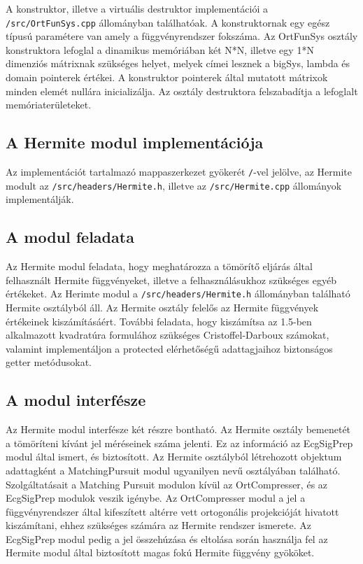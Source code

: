 \documentclass[oneside,titlepage,12pt,a4paper]{report}
\begin{document}
\par A konstruktor, illetve a virtuális destruktor implementációi a \texttt{/src/OrtFunSys.cpp} állományban találhatóak. A konstruktornak egy egész típusú paramétere van amely a függvényrendszer fokszáma. Az OrtFunSys osztály konstruktora lefoglal a dinamikus memóriában két N*N, illetve egy 1*N dimenziós mátrixnak szükséges helyet, melyek címei lesznek a bigSys, lambda és domain pointerek értékei. A konstruktor pointerek által mutatott mátrixok minden elemét nullára inicializálja. Az osztály destruktora felszabadítja a lefoglalt memóriaterületeket. 


\subsection{A Hermite modul implementációja}

Az implementációt tartalmazó mappaszerkezet gyökerét \texttt{/}-vel jelölve, az Hermite modult  az \texttt{/src/headers/Hermite.h}, illetve az \texttt{/src/Hermite.cpp} állományok implementálják.

\subsection*{A modul feladata}

\par Az Hermite modul feladata, hogy meghatározza a tömörítő eljárás által felhasznált Hermite függvényeket, illetve a felhasználásukhoz szükséges egyéb értékeket. Az Herimte modul a \texttt{/src/headers/Hermite.h} állományban található Hermite osztályból áll. Az Hermite osztály felelős az Hermite függvények értékeinek kiszámításáért. További feladata, hogy kiszámítsa az 1.5-ben alkalmazott kvadratúra formulához szükséges Cristoffel-Darboux számokat, valamint implementáljon a protected elérhetőségű adattagjaihoz biztonságos getter metódusokat.

\subsection*{A modul interfésze}

\par Az Hermite modul interfésze két részre bontható. Az Hermite osztály bemenetét a tömöríteni kívánt jel méréseinek száma jelenti. Ez az információ az EcgSigPrep modul által ismert, és biztosított. Az Hermite osztályból létrehozott objektum adattagként a MatchingPursuit modul ugyanilyen nevű osztályában található. Szolgáltatásait a Matching Pursuit modulon kívül az OrtCompresser, és az EcgSigPrep modulok veszik igénybe. Az OrtCompresser modul a jel a függvényrendszer által kifeszített altérre vett ortogonális projekcióját hivatott kiszámítani, ehhez szükséges számára az Hermite rendszer ismerete. Az EcgSigPrep modul pedig a jel összehúzása és eltolása során használja fel az Hermite modul által biztosított magas fokú Hermite függvény gyököket.   
\end{document}
